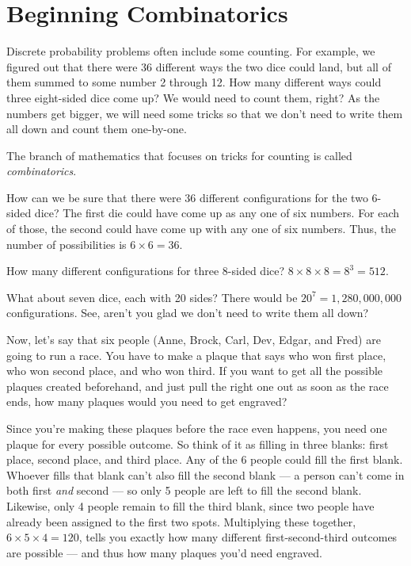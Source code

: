 \chapter{Beginning Combinatorics}

Discrete probability problems often include some counting. For
example, we figured out that there were 36 different ways the two dice could land, 
but all of them summed to some number 2 through 12. How
many different ways could three eight-sided dice come up? We would need to
count them, right? As the numbers get bigger, we will need some tricks so that
we don't need to write them all down and count them one-by-one.

The branch of mathematics that focuses on tricks for counting is
called \textit{combinatorics}.

How can we be sure that there were 36 different configurations for the
two 6-sided dice? The first die could have come up as any one of six
numbers. For each of those, the second could have come up with any one
of six numbers. Thus, the number of possibilities is $ 6 \times 6 =
36.$

How many different configurations for three 8-sided dice?  $8 \times 8
\times 8 = 8^3 = 512$.

What about seven dice, each with 20 sides? There would be $20^7=1,280,000,000$
configurations. See, aren't you glad we don't need to write them all
down?

Now, let's say that six people (Anne, Brock, Carl, Dev, Edgar, and Fred) are
going to run a race. You have to make a plaque that says who won first
place, who won second place, and who won third. If you want to get all
the possible plaques created beforehand, and just pull the right one
out as soon as the race ends, how many plaques would you need to get
engraved?


Since you're making these plaques before the race even happens, you need one
plaque for every possible outcome. So think of it as filling in three blanks:
first place, second place, and third place. Any of the 6 people could fill
the first blank. Whoever fills that blank can't also fill the second blank
--- a person can't come in both first \textit{and} second --- so only 5
people are left to fill the second blank. Likewise, only 4 people remain
to fill the third blank, since two people have already been assigned to
the first two spots. Multiplying these together, $6 \times 5 \times 4 =
120$, tells you exactly how many different first-second-third outcomes
are possible --- and thus how many plaques you'd need engraved.

